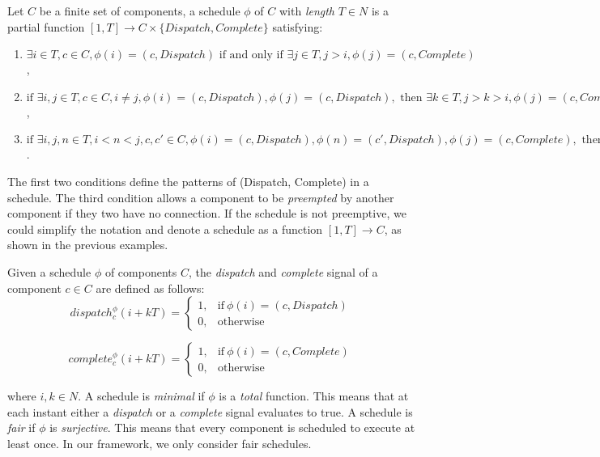 Let $C$ be a finite set of components, a schedule $\phi$ of $C$ with \emph{length} $T\in N$ is a partial function $[1, T] \rightarrow C\times \{Dispatch, Complete\}$ satisfying:

\begin{enumerate}
	\item $ \exists i\in T, c\in C, \phi(i) = (c, Dispatch) \text{ if and only if } \exists j\in T, j > i, \phi(j) =  (c, Complete) $,
	\item $ \text{if } \exists i, j\in T, c\in C, i \neq j, \phi(i) = (c, Dispatch), \phi(j) = (c, Dispatch), \text{ then } \exists k\in T, j >k> i, \phi(j) =  (c, Complete) $,
	\item $ \text{if } \exists i, j, n\in T, i < n < j, c, c'\in C, \phi(i) = (c, Dispatch), \phi(n) = (c', Dispatch), \phi(j) = (c, Complete), \text{ then } c, c' \text{ are not connected, and }\exists m\in T, n < m < j, \phi(m) =  (c', Complete) $.
\end{enumerate}

The first two conditions define the patterns of (Dispatch, Complete) in a schedule. 
The third condition allows a component to be \emph{preempted} by another component if they two have no connection.
If the schedule is not preemptive, we could simplify the notation and denote a schedule as a function $[1, T] \rightarrow C$, as shown in the previous examples.

Given a schedule $\phi$ of components $C$, the \emph{dispatch} and \emph{complete} signal of a component $c \in C$ are defined as follows: 
\begin{equation*}
\label{eqn:dispatch}
    dispatch_c^\phi(i+kT) =
    \begin{cases}
      1, & \text{if}\ \phi(i) = (c, Dispatch) \\
      0, & \text{otherwise}
    \end{cases}
\end{equation*}

\begin{equation*}
\label{eqn:complete}
    complete_c^\phi(i+kT) =
    \begin{cases}
      1, & \text{if}\ \phi(i) = (c, Complete) \\
      0, & \text{otherwise}
    \end{cases}
\end{equation*}

where $i,k\in N$. 
A schedule is \emph{minimal} if $\phi$ is a \emph{total} function. This means that at each instant either a \emph{dispatch} or a \emph{complete} signal evaluates to true. 
A schedule is \emph{fair} if $\phi$ is \emph{surjective}. This means that every component is scheduled to execute at least once.
In our framework, we only consider fair schedules.

